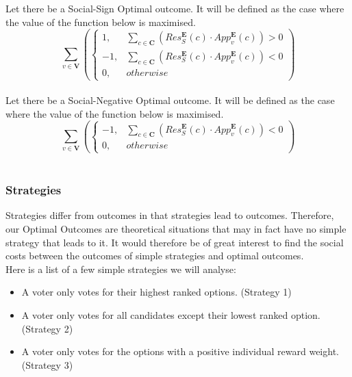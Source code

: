 \documentclass{article}
\begin{document}
Let there be a Social-Sign Optimal outcome. It will be defined as the case where the value of the function below is maximised.
\begin{equation}
\sum^{}_{v \in \boldsymbol{V}}{\left(
\begin{cases}
1, & \sum^{}_{c \in \boldsymbol{C}}{(Res^{\boldsymbol{E}}_{S}(c) \cdot App^{\boldsymbol{E}}_{v}(c))} > 0\\
-1, & \sum^{}_{c \in \boldsymbol{C}}{(Res^{\boldsymbol{E}}_{S}(c) \cdot App^{\boldsymbol{E}}_{v}(c))} < 0\\
0, & {otherwise}
\end{cases}
\right)}
\end{equation}\\

Let there be a Social-Negative Optimal outcome. It will be defined as the case where the value of the function below is maximised.
\begin{equation}
\sum^{}_{v \in \boldsymbol{V}}{\left(
\begin{cases}
-1, & \sum^{}_{c \in \boldsymbol{C}}{(Res^{\boldsymbol{E}}_{S}(c) \cdot App^{\boldsymbol{E}}_{v}(c))} < 0\\
0, & {otherwise}
\end{cases}
\right)}
\end{equation}\\

\subsubsection{Strategies}

Strategies differ from outcomes in that strategies lead to outcomes. Therefore, our Optimal Outcomes are theoretical situations that may in fact have no simple strategy that leads to it. It would therefore be of great interest to find the social costs between the outcomes of simple strategies and optimal outcomes.\\

\noindent Here is a list of a few simple strategies we will analyse:
\begin{itemize}
  \item A voter only votes for their highest ranked options. (Strategy 1)
  \item A voter only votes for all candidates except their lowest ranked option. (Strategy 2)
  \item A voter only votes for the options with a positive individual reward weight. (Strategy 3)
\end{itemize}
\end{document}

